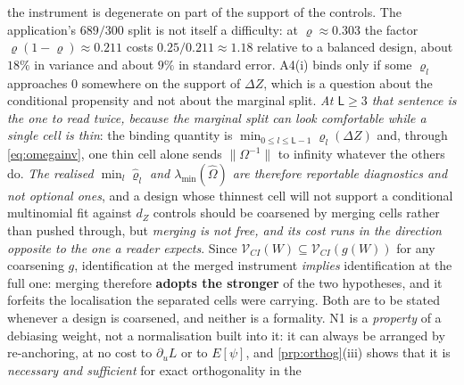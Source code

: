 the instrument is degenerate on part of the support of the controls.
The application's $689/300$ split is not itself a difficulty: at $\varrho\approx0.303$ the
factor $\varrho(1-\varrho)\approx0.211$ costs $0.25/0.211\approx1.18$ relative to a balanced design, 
about $18\%$ in variance and about $9\%$ in standard error. A4(i) binds only if some
$\varrho_l$ approaches $0$
somewhere on the support of $\Delta Z$, which is a question about the conditional propensity and
not about the marginal split. \emph{At $\mathsf L\ge3$ that sentence is the one to read twice, because
the marginal split can look comfortable while a single cell is thin}: the binding quantity is
$\min_{0\le l\le\mathsf L-1}\varrho_l(\Delta Z)$ and, through \eqref{eq:omegainv}, one thin cell alone
sends $\|\Omega^{-1}\|$ to infinity whatever the others do. \emph{The realised
$\min_l\hat\varrho_l$ and $\lambda_{\min}(\hat\Omega)$ are therefore reportable diagnostics and not
optional ones}, and a design whose thinnest cell will not support a conditional multinomial fit against
$d_Z$ controls should be coarsened by merging cells rather than pushed through, but \emph{merging is not free,
and its cost runs in the direction opposite to the one a reader expects}. Since
$\mathcal V_{CI}(W)\subseteq\mathcal V_{CI}(g(W))$ for any coarsening $g$, identification at the
merged instrument \emph{implies} identification at the full one: merging therefore \textbf{adopts the
stronger} of the two hypotheses, and it forfeits the localisation the separated cells were carrying.
Both are to be stated whenever a design is coarsened, and neither is a formality. N1 is a \emph{property} of a debiasing weight, not a normalisation built
into it: it can always be arranged by re-anchoring, at no cost to $\partial_uL$ or to $E[\psi]$, and
\cref{prp:orthog}(iii) shows that it is \emph{necessary and sufficient} for exact orthogonality in the

